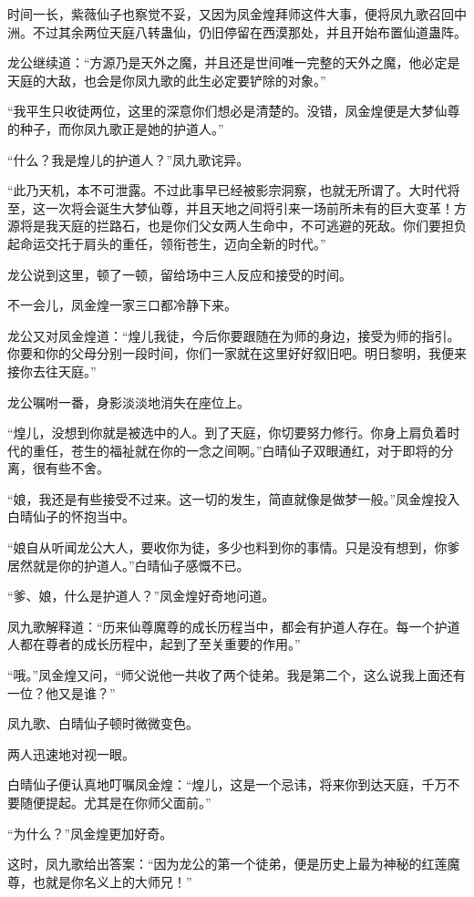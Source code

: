 \begin{this_body}
时间一长，紫薇仙子也察觉不妥，又因为凤金煌拜师这件大事，便将凤九歌召回中洲。不过其余两位天庭八转蛊仙，仍旧停留在西漠那处，并且开始布置仙道蛊阵。

龙公继续道：“方源乃是天外之魔，并且还是世间唯一完整的天外之魔，他必定是天庭的大敌，也会是你凤九歌的此生必定要铲除的对象。”

“我平生只收徒两位，这里的深意你们想必是清楚的。没错，凤金煌便是大梦仙尊的种子，而你凤九歌正是她的护道人。”

“什么？我是煌儿的护道人？”凤九歌诧异。

“此乃天机，本不可泄露。不过此事早已经被影宗洞察，也就无所谓了。大时代将至，这一次将会诞生大梦仙尊，并且天地之间将引来一场前所未有的巨大变革！方源将是我天庭的拦路石，也是你们父女两人生命中，不可逃避的死敌。你们要担负起命运交托于肩头的重任，领衔苍生，迈向全新的时代。”

龙公说到这里，顿了一顿，留给场中三人反应和接受的时间。

不一会儿，凤金煌一家三口都冷静下来。

龙公又对凤金煌道：“煌儿我徒，今后你要跟随在为师的身边，接受为师的指引。你要和你的父母分别一段时间，你们一家就在这里好好叙旧吧。明日黎明，我便来接你去往天庭。”

龙公嘱咐一番，身影淡淡地消失在座位上。

“煌儿，没想到你就是被选中的人。到了天庭，你切要努力修行。你身上肩负着时代的重任，苍生的福祉就在你的一念之间啊。”白晴仙子双眼通红，对于即将的分离，很有些不舍。

“娘，我还是有些接受不过来。这一切的发生，简直就像是做梦一般。”凤金煌投入白晴仙子的怀抱当中。

“娘自从听闻龙公大人，要收你为徒，多少也料到你的事情。只是没有想到，你爹居然就是你的护道人。”白晴仙子感慨不已。

“爹、娘，什么是护道人？”凤金煌好奇地问道。

凤九歌解释道：“历来仙尊魔尊的成长历程当中，都会有护道人存在。每一个护道人都在尊者的成长历程中，起到了至关重要的作用。”

“哦。”凤金煌又问，“师父说他一共收了两个徒弟。我是第二个，这么说我上面还有一位？他又是谁？”

凤九歌、白晴仙子顿时微微变色。

两人迅速地对视一眼。

白晴仙子便认真地叮嘱凤金煌：“煌儿，这是一个忌讳，将来你到达天庭，千万不要随便提起。尤其是在你师父面前。”

“为什么？”凤金煌更加好奇。

这时，凤九歌给出答案：“因为龙公的第一个徒弟，便是历史上最为神秘的红莲魔尊，也就是你名义上的大师兄！”

\end{this_body}

